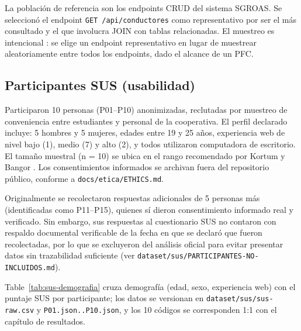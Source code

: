 La población de referencia son los endpoints CRUD del sistema SGROAS. Se seleccionó el endpoint \texttt{GET /api/conductores} como representativo por ser el más consultado y el que involucra JOIN con tablas relacionadas. El muestreo es intencional \cite{baltes2022}: se elige un endpoint representativo en lugar de muestrear aleatoriamente entre todos los endpoints, dado el alcance de un PFC.

\subsection{Participantes SUS (usabilidad)}

Participaron 10 personas (P01--P10) anonimizadas, reclutadas por muestreo de conveniencia entre estudiantes y personal de la cooperativa. El perfil declarado incluye: 5 hombres y 5 mujeres, edades entre 19 y 25 años, experiencia web de nivel bajo (1), medio (7) y alto (2), y todos utilizaron computadora de escritorio. El tamaño muestral (n = 10) se ubica en el rango recomendado por Kortum y Bangor \cite{kortum2013}. Los consentimientos informados se archivan fuera del repositorio público, conforme a \texttt{docs/etica/ETHICS.md}.

Originalmente se recolectaron respuestas adicionales de 5 personas más (identificadas como P11--P15), quienes sí dieron consentimiento informado real y verificado. Sin embargo, sus respuestas al cuestionario SUS no contaron con respaldo documental verificable de la fecha en que se declaró que fueron recolectadas, por lo que se excluyeron del análisis oficial para evitar presentar datos sin trazabilidad suficiente (ver \texttt{dataset/sus/PARTICIPANTES-NO-INCLUIDOS.md}).

Table~\ref{tab:sus-demografia} cruza demografía (edad, sexo, experiencia web) con el puntaje SUS por participante; los datos se versionan en \texttt{dataset/sus/sus-raw.csv} y \texttt{P01.json..P10.json}, y los 10 códigos se corresponden 1:1 con el capítulo de resultados.

